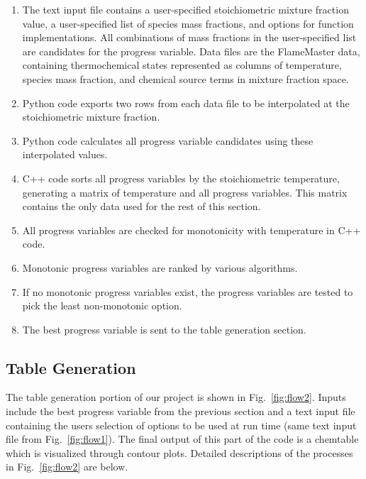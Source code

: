 \documentclass[11pt]{article}
\begin{document}
\begin{enumerate} 
\item The text input file contains a user-specified stoichiometric
  mixture fraction value, a user-specified list of species mass
  fractions, and options for function implementations. All
  combinations of mass fractions in the user-specified list are
  candidates for the progress variable. Data files are the FlameMaster
  data, containing thermochemical states represented as columns of
  temperature, species mass fraction, and chemical source terms in
  mixture fraction space.
\item Python code exports two rows from each data file to
  be interpolated at the stoichiometric mixture fraction.
\item Python code calculates all progress variable candidates using
  these interpolated values.
\item C++ code sorts all progress variables by the stoichiometric
  temperature, generating a matrix of temperature and all progress
  variables. This matrix contains the only data used for the rest of
  this section.
\item All progress variables are checked for monotonicity with
  temperature in C++ code.
\item Monotonic progress variables are ranked by various algorithms.
\item If no monotonic progress variables exist, the progress variables
  are tested to pick the least non-monotonic option.
\item The best progress variable is sent to the table generation
  section.
\end{enumerate}

\subsection{Table Generation}
The table generation portion of our project is shown in
Fig.~\ref{fig:flow2}.  Inputs include the best progress variable from
the previous section and a text input file
containing the user\textquotesingle s selection of options to be used
at run time (same text input file from Fig.~\ref{fig:flow1}).  The
final output of this part of the code is a chemtable which is
visualized through contour plots.  Detailed descriptions of the
processes in Fig.~\ref{fig:flow2} are below.
\end{document}
